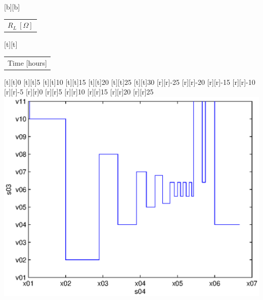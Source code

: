 %    
%
%
\begin{psfrags}%
\psfragscanon%
%
[b][b]{\color[rgb]{0,0,0}\setlength{\tabcolsep}{0pt}\begin{tabular}{c}$R_L\ [\Omega]$\end{tabular}}%
[t][t]{\color[rgb]{0,0,0}\setlength{\tabcolsep}{0pt}\begin{tabular}{c}Time [hours]\end{tabular}}%
%
[t][t]{0}%
[t][t]{5}%
[t][t]{10}%
[t][t]{15}%
[t][t]{20}%
[t][t]{25}%
[t][t]{30}%
%
[r][r]{-25}%
[r][r]{-20}%
[r][r]{-15}%
[r][r]{-10}%
[r][r]{-5}%
[r][r]{0}%
[r][r]{5}%
[r][r]{10}%
[r][r]{15}%
[r][r]{20}%
[r][r]{25}%
%
\includegraphics[width=15cm]{input.eps}%
\end{psfrags}%
%
